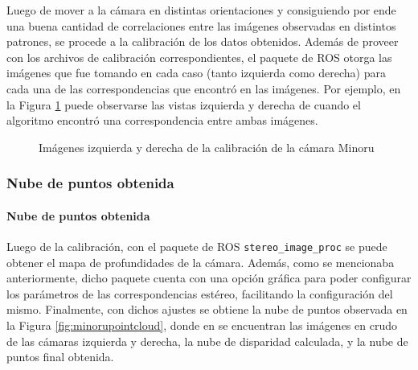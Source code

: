Luego de mover a la cámara en distintas orientaciones y consiguiendo por ende una buena cantidad de correlaciones entre las imágenes observadas en distintos patrones, se procede a la calibración de los datos obtenidos. Además de proveer con los archivos de calibración correspondientes, el paquete de ROS otorga las imágenes que fue tomando en cada caso (tanto izquierda como derecha) para cada una de las correspondencias que encontró en las imágenes. Por ejemplo, en la Figura \ref{fig:minorurightleft} puede observarse las vistas izquierda y derecha de cuando el algoritmo encontró una correspondencia entre ambas imágenes.

\begin{figure}[!ht]
    \centering
    \qquad
    \caption{Imágenes izquierda y derecha de la calibración de la cámara Minoru}
    \label{fig:minorurightleft}
\end{figure}

\subsubsection{Nube de puntos obtenida}
\else
\paragraph{Nube de puntos obtenida}
\fi
Luego de la calibración, con el paquete de ROS \texttt{stereo\_image\_proc} se puede obtener el mapa de profundidades de la cámara. Además, como se mencionaba anteriormente, dicho paquete cuenta con una opción gráfica para poder configurar los parámetros de las correspondencias estéreo, facilitando la configuración del mismo. Finalmente, con dichos ajustes se obtiene la nube de puntos observada en la Figura \ref{fig:minorupointcloud}, donde en se encuentran las imágenes en crudo de las cámaras izquierda y derecha, la nube de disparidad calculada, y la nube de puntos final obtenida.

